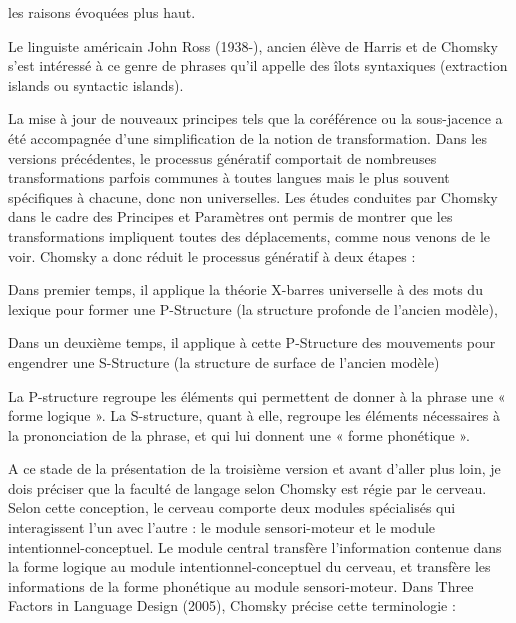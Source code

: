 
les raisons évoquées plus haut.\par

Le linguiste américain John Ross (1938-), ancien élève de Harris et de Chomsky s’est intéressé à ce genre de phrases qu’il appelle des îlots syntaxiques (extraction islands ou syntactic islands).\par


La mise à jour de nouveaux principes tels que la coréférence ou la sous-jacence a été accompagnée d’une simplification de la notion de transformation. Dans les versions précédentes, le processus génératif comportait de nombreuses transformations parfois communes à toutes langues mais le plus souvent spécifiques à chacune, donc non universelles. Les études conduites par Chomsky dans le cadre des Principes et Paramètres ont permis de montrer que les transformations impliquent toutes des déplacements, comme nous venons de le voir. Chomsky a donc réduit le processus génératif à deux étapes :\par

Dans premier temps, il applique la théorie X-barres universelle à des mots du lexique pour former une P-Structure (la structure profonde de l’ancien modèle),\par

Dans un deuxième temps, il applique à cette P-Structure des mouvements pour engendrer une S-Structure (la structure de surface de l’ancien modèle)\par

La P-structure regroupe les éléments qui permettent de donner à la phrase une « forme logique ». La S-structure, quant à elle, regroupe les éléments nécessaires à la prononciation de la phrase, et qui lui donnent une « forme phonétique ».\par


A ce stade de la présentation de la troisième version et avant d’aller plus loin, je dois préciser que la faculté de langage selon Chomsky est régie par le cerveau. Selon cette conception, le cerveau comporte deux modules spécialisés qui interagissent l’un avec l’autre : le module sensori-moteur et le module intentionnel-conceptuel. Le module central transfère l’information contenue dans la forme logique au module intentionnel-conceptuel du cerveau, et transfère les informations de la forme phonétique au module sensori-moteur. Dans Three Factors in Language Design (2005), Chomsky précise cette terminologie :\par


